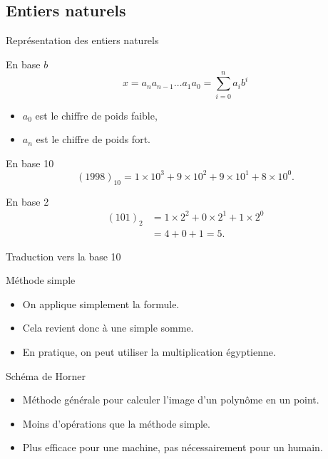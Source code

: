 \subsection{Entiers naturels}

\begin{frame}{Représentation des entiers naturels}
 \begin{block}{En base $b$}
 \[
  x = a_n a_{n-1} \ldots a_1 a_0  = \sum_{i=0}^n a_i b^i
  \]
  \begin{itemize}
  \item $a_0$ est le chiffre de poids faible,
  \item $a_n$ est le chiffre de poids fort.
  \end{itemize}
\end{block}
\begin{exampleblock}{En base 10}
    \[
      (1998)_{10} = 1 \times 10^3 + 9 \times 10^2 + 9 \times 10^1 + 8 \times 10^0 .
    \]
\end{exampleblock}

\begin{exampleblock}{En base 2}
  \begin{align*}
    (101)_2 & = 1 \times 2^2 + 0 \times 2^1 + 1 \times 2^0 \\
            &= 4 + 0 + 1 = 5.
  \end{align*}

\end{exampleblock}
\end{frame}

\begin{frame}{Traduction vers la base 10}
  \begin{block}{Méthode simple}
    \begin{itemize}
    \item On applique simplement la formule.
    \item Cela revient donc à une simple somme.
    \item En pratique, on peut utiliser la multiplication égyptienne.
    \end{itemize}
  \end{block}

  \begin{block}{Schéma de Horner}
    \begin{itemize}
    \item Méthode générale pour calculer l'image d'un polynôme en un point.
    \item Moins d'opérations que la méthode simple.
    \item Plus efficace pour une machine, pas nécessairement pour un humain.
    \end{itemize}

  \end{block}
\end{frame}



